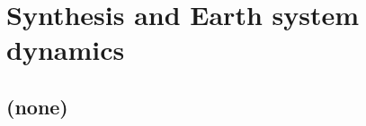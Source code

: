 
\cleardoublepage


\chapter{Synthesis and Earth system dynamics}\label{ch:synthesis}

\hfill \break

\newpage

\section{(none)}

